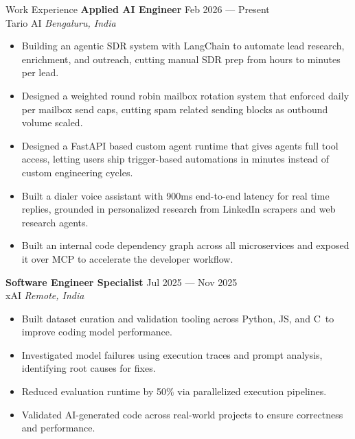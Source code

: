 \documentclass{resume}
\newcommand{\CPP}{C\nolinebreak[4]\hspace{-.05em}\raisebox{.25ex}{\footnotesize\bf ++}}
\begin{document}

    \begin{rSection}{Work Experience}
        \textbf{Applied AI Engineer} \hfill Feb 2026 --- Present \\
        Tario AI \hfill \textit{Bengaluru, India}
        \begin{itemize}
            \item Building an agentic SDR system with LangChain to automate lead research, enrichment, and outreach, cutting manual SDR prep from hours to minutes per lead.
            \item Designed a weighted round robin mailbox rotation system that enforced daily per mailbox send caps, cutting spam related sending blocks as outbound volume scaled.
            \item Designed a FastAPI based custom agent runtime that gives agents full tool access, letting users ship trigger-based automations in minutes instead of custom engineering cycles.
            \item Built a dialer voice assistant with 900ms end-to-end latency for real time replies, grounded in personalized research from LinkedIn scrapers and web research agents.
            \item Built an internal code dependency graph across all microservices and exposed it over MCP to accelerate the developer workflow.
        \end{itemize}

        \textbf{Software Engineer Specialist} \hfill Jul 2025 --- Nov 2025 \\
        xAI \hfill \textit{Remote, India}
        \begin{itemize}
            \item Built dataset curation and validation tooling across Python, JS, and \CPP\ to improve coding model performance.
            \item Investigated model failures using execution traces and prompt analysis, identifying root causes for fixes.
            \item Reduced evaluation runtime by 50\% via parallelized execution pipelines.
            \item Validated AI-generated code across real-world projects to ensure correctness and performance.
        \end{itemize}


\end{rSection}
\end{document}

